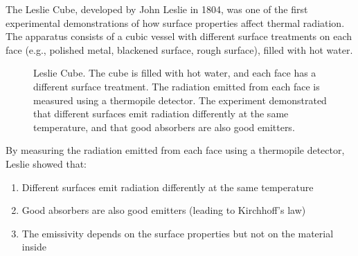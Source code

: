 \documentclass[
  a4paper,
]{book}
\providecommand{\tightlist}{%
  \setlength{\itemsep}{0pt}\setlength{\parskip}{0pt}}
\begin{document}
\begin{tcolorbox}[enhanced jigsaw, coltitle=black, title=\textcolor{quarto-callout-note-color}{\faInfo}\hspace{0.5em}{The Leslie Cube Experiment}, colframe=quarto-callout-note-color-frame, toprule=.15mm, opacitybacktitle=0.6, left=2mm, opacityback=0, breakable, toptitle=1mm, bottomtitle=1mm, leftrule=.75mm, arc=.35mm, titlerule=0mm, colbacktitle=quarto-callout-note-color!10!white, rightrule=.15mm, bottomrule=.15mm, colback=white]

The Leslie Cube, developed by John Leslie in 1804, was one of the first
experimental demonstrations of how surface properties affect thermal
radiation. The apparatus consists of a cubic vessel with different
surface treatments on each face (e.g., polished metal, blackened
surface, rough surface), filled with hot water.

\begin{figure}[H]


\caption{\label{fig-leslie-cube}Leslie Cube. The cube is filled with hot
water, and each face has a different surface treatment. The radiation
emitted from each face is measured using a thermopile detector. The
experiment demonstrated that different surfaces emit radiation
differently at the same temperature, and that good absorbers are also
good emitters.}

\end{figure}%

By measuring the radiation emitted from each face using a thermopile
detector, Leslie showed that:

\begin{enumerate}
\def\labelenumi{\arabic{enumi}.}
\tightlist
\item
  Different surfaces emit radiation differently at the same temperature
\item
  Good absorbers are also good emitters (leading to Kirchhoff's law)
\item
  The emissivity depends on the surface properties but not on the
  material inside
\end{enumerate}


\end{tcolorbox}
\end{document}
